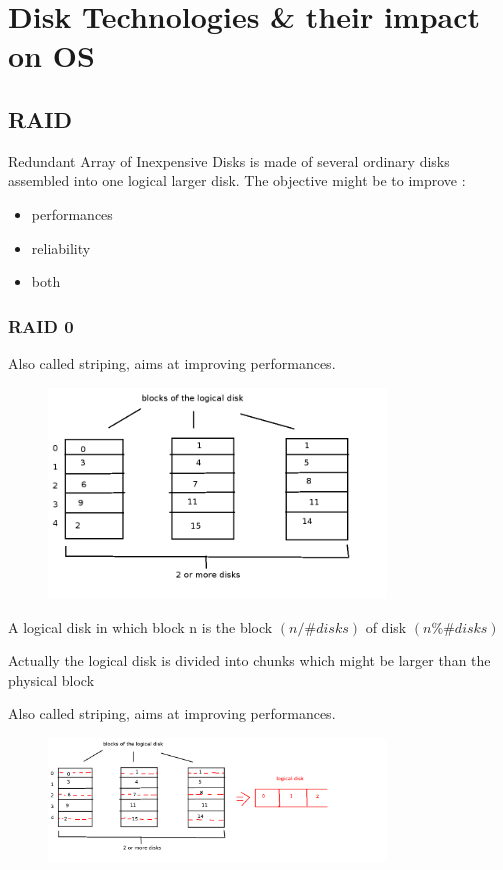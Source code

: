 \chapter{Disk Technologies & their impact on OS}

\section{RAID}

Redundant Array of Inexpensive Disks is made of several ordinary disks assembled into one logical larger disk. The objective might be to improve :
\begin{itemize}
  \item performances
  \item reliability
  \item both
\end{itemize}

\subsection{RAID 0}

Also called striping, aims at improving performances.
\begin{figure}[h!]
  \begin{center}
    \includegraphics[width=0.8\textwidth]{raid_0.png}
    \caption{}
  \end{center}
\end{figure}

A logical disk in which block n is the block $(n/\#disks)$ of disk $(n \% \#disks)$

Actually the logical disk is divided into chunks which might be larger than the physical block

Also called striping, aims at improving performances.
\begin{figure}[h!]
  \begin{center}
    \includegraphics[width=0.8\textwidth]{raid_0_chunks.png}
    \caption{}
  \end{center}
\end{figure}

